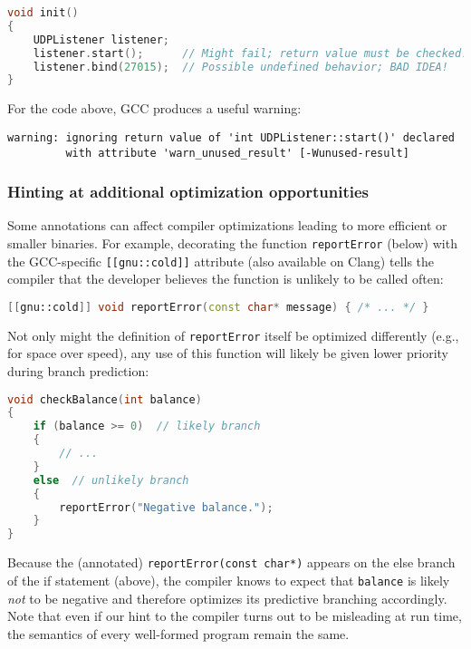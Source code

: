 \begin{lstlisting}[language=C++]
void init()
{
    UDPListener listener;
    listener.start();      // Might fail; return value must be checked!
    listener.bind(27015);  // Possible undefined behavior; BAD IDEA!
}
\end{lstlisting}

\noindent For the code above, GCC produces a useful warning:

\begin{lstlisting}[style=plain]
warning: ignoring return value of 'int UDPListener::start()' declared
         with attribute 'warn_unused_result' [-Wunused-result]
\end{lstlisting}


\subsubsection[Hinting at additional optimization opportunities]{Hinting at additional optimization opportunities}\label{hinting-at-additional-optimization-opportunities}

Some annotations can affect compiler optimizations leading to more
efficient or smaller binaries. For example, decorating the function
\texttt{reportError} (below) with the GCC-specific
\texttt{[[gnu::cold]]} attribute (also available on Clang) tells the
compiler that the developer believes the function is unlikely to be
called often:

\begin{lstlisting}[language=C++]
[[gnu::cold]] void reportError(const char* message) { /* ... */ }
\end{lstlisting}

\noindent Not only might the definition of \texttt{reportError} itself be
optimized differently (e.g., for space over speed), any use of this
function will likely be given lower priority during branch \mbox{prediction}:

\begin{lstlisting}[language=C++]
void checkBalance(int balance)
{
    if (balance >= 0)  // likely branch
    {
        // ...
    }
    else  // unlikely branch
    {
        reportError("Negative balance.");
    }
}
\end{lstlisting}

\noindent Because the (annotated) \texttt{reportError(const}~\texttt{char*)}
appears on the else branch of the if statement (above), the compiler
knows to expect that \texttt{balance} is likely \emph{not} to be
negative and therefore optimizes its predictive branching accordingly.
Note that even if our hint to the compiler turns out to be misleading at
run time, the semantics of every well-formed program remain the same.

